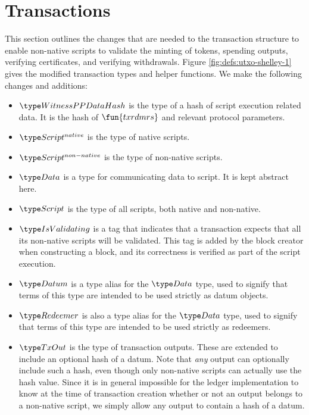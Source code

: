 \section{Transactions}
\label{sec:transactions}

This section outlines the changes that are needed to the transaction
structure to enable non-native scripts to validate
the minting of tokens, spending outputs, verifying certificates, and
verifying withdrawals.
%
Figure \ref{fig:defs:utxo-shelley-1} gives the modified transaction types and helper functions.
We make the following changes and additions:

\begin{itemize}
  \item $\WitnessPPDataHash$ is the type of a hash of script execution
  related data. It is the hash of $\fun{txrdmrs}$ and relevant protocol parameters.

  \item $\ScriptNative$ is the type of native scripts.

  \item $\ScriptNonNative$ is the type of non-native scripts.

  \item $\Data$ is a type for communicating data to script.  It is kept abstract here.

  \item $\Script$ is the type of all scripts, both native and non-native.

  \item $\IsValidating$ is a tag that indicates that a transaction
  expects that all its non-native scripts will be validated.
  This tag is added by the block creator when
  constructing a block, and its correctness is verified as part of the script execution.

  \item $\Datum$ is a type alias for the $\Data$ type, used to signify that
  terms of this type are intended to be used strictly as datum objects.

  \item $\Redeemer$ is also a type alias for the $\Data$ type, used to signify that
  terms of this type are intended to be used strictly as redeemers.

  \item $\TxOut$ is the type of transaction outputs. These are extended to include
  an optional hash of a datum. Note that \emph{any} output can
  optionally include such a hash, even though only non-native scripts
  can actually use the hash value. Since it is in general impossible for the ledger implementation to
  know at the time of transaction creation whether or not an output belongs to a non-native
  script, we simply allow any output to contain a hash of a datum.


\end{itemize}

